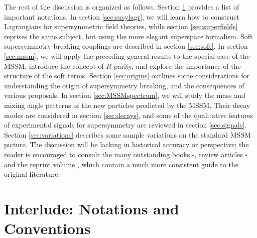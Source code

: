 \documentclass[12pt]{article}
\begin{document}
The rest of the discussion is organized as follows. Section
\ref{sec:notations} provides a list of important notations. In section
\ref{sec:susylagr}, we will learn how to construct Lagrangians for
supersymmetric field theories, while section \ref{sec:superfields} 
reprises the same subject, but using the more elegant superspace formalism.
Soft supersymmetry-breaking couplings are
described in section \ref{sec:soft}. In section \ref{sec:mssm}, we will
apply the preceding general results to the special case of the MSSM,
introduce the concept of $R$-parity, and explore the importance of the
structure of the soft terms. Section \ref{sec:origins} outlines some
considerations for understanding the origin of supersymmetry breaking, and
the consequences of various proposals. In section \ref{sec:MSSMspectrum},
we will study the mass and mixing angle patterns of the new particles
predicted by the MSSM. Their decay modes are considered in section
\ref{sec:decays}, and some of the qualitative features of experimental
signals for supersymmetry are reviewed in section \ref{sec:signals}.
Section \ref{sec:variations} describes some sample variations on the
standard MSSM picture. The discussion will be lacking in historical
accuracy or perspective; the reader is
encouraged to consult the many outstanding books
\cite{WessBaggerbook}-\cite{Shifman:2012zz}, 
review articles
\cite{HaberKanereview}-\cite{Bertolini:2013via} 
and the reprint volume
\cite{reprints}, which contain a much more consistent guide to the
original literature. 


\section{Interlude: Notations and Conventions}\label{sec:notations}
\setcounter{equation}{0}
\setcounter{figure}{0}
\setcounter{table}{0}
\setcounter{footnote}{1}
\end{document}
